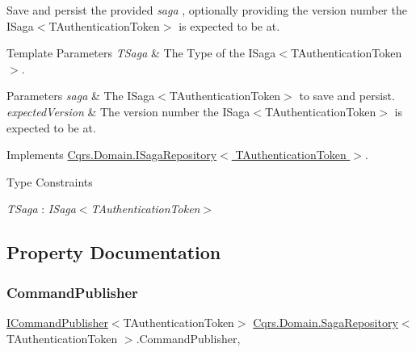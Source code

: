 Save and persist the provided {\itshape saga} , optionally providing the version number the I\+Saga$<$\+T\+Authentication\+Token$>$ is expected to be at. 


\begin{DoxyTemplParams}{Template Parameters}
{\em T\+Saga} & The Type of the I\+Saga$<$\+T\+Authentication\+Token$>$.\\
\hline
\end{DoxyTemplParams}

\begin{DoxyParams}{Parameters}
{\em saga} & The I\+Saga$<$\+T\+Authentication\+Token$>$ to save and persist.\\
\hline
{\em expected\+Version} & The version number the I\+Saga$<$\+T\+Authentication\+Token$>$ is expected to be at.\\
\hline
\end{DoxyParams}


Implements \hyperlink{interfaceCqrs_1_1Domain_1_1ISagaRepository_ad539cdc70f3168d0335c9510742e25cd_ad539cdc70f3168d0335c9510742e25cd}{Cqrs.\+Domain.\+I\+Saga\+Repository$<$ T\+Authentication\+Token $>$}.

\begin{Desc}
\item[Type Constraints]\begin{description}
\item[{\em T\+Saga} : {\em I\+Saga$<$T\+Authentication\+Token$>$}]\end{description}
\end{Desc}


\subsection{Property Documentation}
\mbox{\label{classCqrs_1_1Domain_1_1SagaRepository_a65911c8ed6a372f3cccb4c175f198abb_a65911c8ed6a372f3cccb4c175f198abb}} 
\subsubsection{\texorpdfstring{Command\+Publisher}{CommandPublisher}}
{\footnotesize\ttfamily \hyperlink{interfaceCqrs_1_1Commands_1_1ICommandPublisher}{I\+Command\+Publisher}$<$T\+Authentication\+Token$>$ \hyperlink{classCqrs_1_1Domain_1_1SagaRepository}{Cqrs.\+Domain.\+Saga\+Repository}$<$ T\+Authentication\+Token $>$.Command\+Publisher\hspace{0.3cm}{\ttfamily [get]}, {\ttfamily [protected]}}



